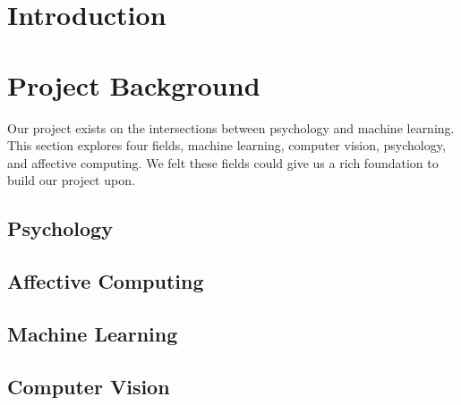 \documentclass{article}
\begin{document}



\tableofcontents

\newpage

\section{Introduction}


\newpage

\section{Project Background}
Our project exists on the intersections between psychology and machine learning.
This section explores four fields, machine learning, computer vision, psychology, and affective computing.
We felt these fields could give us a rich foundation to build our project upon.


\subsection{Psychology}


\subsection{Affective Computing}


\subsection{Machine Learning}


\subsection{Computer Vision}  \label{section:cv}


\newpage
\end{document}

